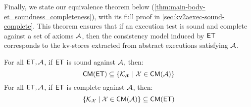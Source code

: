 Finally, we state our equivalence theorem below (\cref{thm:main-body-et_soundness_completeness}), with its full proof in \cref{sec:kv2aexec-sound-complete}. 
This theorem ensures that if an execution test is sound and complete against a set of axioms $\mathcal{A}$, 
then the consistency model induced by $\mathsf{ET}$ corresponds to the kv-stores extracted from abstract executions satisfying $\mathcal{A}$.

\begin{theorem}
\label{thm:main-body-et_soundness_completeness}
For all $\mathsf{ET}, \mathcal{A}$, if $\mathsf{ET}$ is sound against $\mathcal{A}$, then:
\[
    \mathsf{CM}(\mathsf{ET}) \subseteq \{ \mathcal{K}_{\mathcal{X}} \mid \mathcal{X} \in \mathsf{CM}(\mathcal{A})\}
\]
For all $\mathsf{ET}, \mathcal{A}$, if $\mathsf{ET}$ is complete against $\mathcal{A}$, then:
\[
    \{ \mathcal{K}_{\mathcal{X}} \mid \mathcal{X} \in \mathsf{CM}(\mathcal{A})\}  \subseteq \mathsf{CM}(\mathsf{ET})
\]
\end{theorem} 


